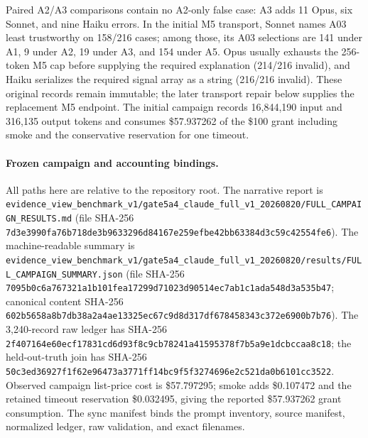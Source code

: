 \documentclass{article}
\begin{document}
Paired A2/A3 comparisons contain no A2-only false case: A3 adds 11 Opus, six Sonnet, and nine
Haiku errors. In the initial M5 transport, Sonnet names A03 least trustworthy on 158/216 cases;
among those, its A03 selections are 141 under A1, 9 under A2, 19 under A3, and 154 under A5. Opus
usually exhausts the 256-token M5 cap before supplying the required explanation (214/216 invalid),
and Haiku serializes the required signal array as a string (216/216 invalid). These original records
remain immutable; the later transport repair below supplies the replacement M5 endpoint. The
initial campaign records 16,844,190 input and 316,135 output tokens and consumes
\$57.937262 of the \$100 grant including smoke and the conservative reservation for one timeout.

\paragraph{Frozen campaign and accounting bindings.}
All paths here are relative to the repository root. The narrative report is
\nolinkurl{evidence_view_benchmark_v1/gate5a4_claude_full_v1_20260820/FULL_CAMPAIGN_RESULTS.md}
(file SHA-256 \nolinkurl{7d3e3990fa76b718de3b9633296d84167e259efbe42bb63384d3c59c42554fe6}).
The machine-readable summary is
\nolinkurl{evidence_view_benchmark_v1/gate5a4_claude_full_v1_20260820/results/FULL_CAMPAIGN_SUMMARY.json}
(file SHA-256 \nolinkurl{7095b0c6a767321a1b101fea17299d71023d90514ec7ab1c1ada548d3a535b47};
canonical content SHA-256 \nolinkurl{602b5658a8b7db38a2a4ae13325ec67c9d8d317df678458343c372e6900b7b76}).
The 3,240-record raw ledger has SHA-256
\nolinkurl{2f407164e60ecf17831cd6d93f8c9cb78241a41595378f7b5a9e1dcbccaa8c18}; the
held-out-truth join has SHA-256
\nolinkurl{50c3ed36927f1f62e96473a3771ff14bc9f5f3274696e2c521da0b6101cc3522}.
Observed campaign list-price cost is \$57.797295; smoke adds \$0.107472 and the retained timeout
reservation \$0.032495, giving the reported \$57.937262 grant consumption. The sync manifest binds
the prompt inventory, source manifest, normalized ledger, raw validation, and exact filenames.
\end{document}
